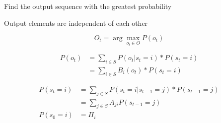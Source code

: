\documentclass[a4paper,12pt]{article}
\begin{document}
            Find the output sequence with the greatest probability

            Output elements are independent of each other

            \begin{equation}
                O_t=\arg\max_{o_t\in O} P(o_t)
            \end{equation}

            \begin{equation}
                \begin{split}
                    P(o_t)
                    &=\sum_{i\in S} P(o_t|s_t=i)*P(s_t=i)\\
                    &=\sum_{i\in S} B_i(o_t)*P(s_t=i)
                \end{split}
            \end{equation}

            \begin{equation}
                \begin{split}
                    P(s_t=i)
                    &=\sum_{j\in S} P(s_t=i|s_{t-1}=j)*P(s_{t-1}=j)\\
                    &=\sum_{j\in S} A_{ji}P(s_{t-1}=j)\\
                    P(s_0=i)&=\Pi_i
                \end{split}
            \end{equation}
\end{document}
